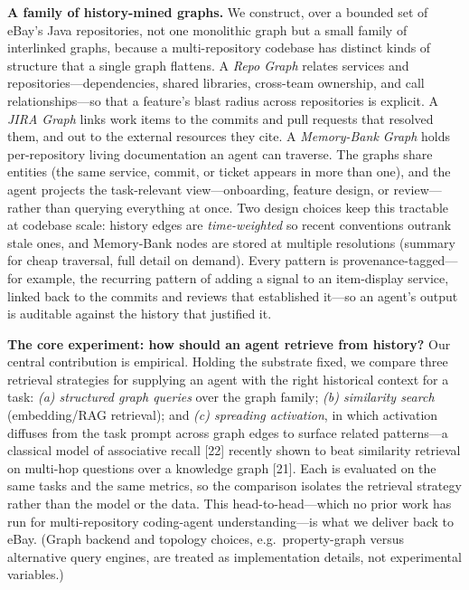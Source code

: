 \documentclass[11pt, letterpaper]{article}
\begin{document}
\textbf{A family of history-mined graphs.} We construct, over a bounded set of eBay's Java repositories, not one monolithic graph but a small family of interlinked graphs, because a multi-repository codebase has distinct kinds of structure that a single graph flattens. A \emph{Repo Graph} relates services and repositories---dependencies, shared libraries, cross-team ownership, and call relationships---so that a feature's blast radius across repositories is explicit. A \emph{JIRA Graph} links work items to the commits and pull requests that resolved them, and out to the external resources they cite. A \emph{Memory-Bank Graph} holds per-repository living documentation an agent can traverse. The graphs share entities (the same service, commit, or ticket appears in more than one), and the agent projects the task-relevant view---onboarding, feature design, or review---rather than querying everything at once. Two design choices keep this tractable at codebase scale: history edges are \emph{time-weighted} so recent conventions outrank stale ones, and Memory-Bank nodes are stored at multiple resolutions (summary for cheap traversal, full detail on demand). Every pattern is provenance-tagged---for example, the recurring pattern of adding a signal to an item-display service, linked back to the commits and reviews that established it---so an agent's output is auditable against the history that justified it.

\textbf{The core experiment: how should an agent retrieve from history?} Our central contribution is empirical. Holding the substrate fixed, we compare three retrieval strategies for supplying an agent with the right historical context for a task: \emph{(a) structured graph queries} over the graph family; \emph{(b) similarity search} (embedding/RAG retrieval); and \emph{(c) spreading activation}, in which activation diffuses from the task prompt across graph edges to surface related patterns---a classical model of associative recall [22] recently shown to beat similarity retrieval on multi-hop questions over a knowledge graph [21]. Each is evaluated on the same tasks and the same metrics, so the comparison isolates the retrieval strategy rather than the model or the data. This head-to-head---which no prior work has run for multi-repository coding-agent understanding---is what we deliver back to eBay. (Graph backend and topology choices, e.g.\ property-graph versus alternative query engines, are treated as implementation details, not experimental variables.)
\end{document}
